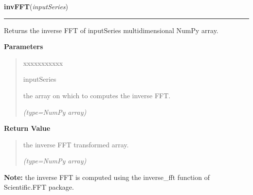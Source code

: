 \hspace{.8\funcindent}\begin{boxedminipage}{\funcwidth}

    \raggedright \textbf{invFFT}(\textit{inputSeries})

    \vspace{-1.5ex}

    \rule{\textwidth}{0.5\fboxrule}
\setlength{\parskip}{2ex}
    Returns the inverse FFT of {\textbar}inputSeries{\textbar} 
    multidimensional NumPy array.

\setlength{\parskip}{1ex}
      \textbf{Parameters}
      \vspace{-1ex}

      \begin{quote}
        \begin{Ventry}{xxxxxxxxxxx}

          \item[inputSeries]

          the array on which to computes the inverse FFT.

            {\it (type=NumPy array)}

        \end{Ventry}

      \end{quote}

      \textbf{Return Value}
    \vspace{-1ex}

      \begin{quote}
      the inverse FFT transformed array.

      {\it (type=NumPy array)}

      \end{quote}

\textbf{Note:} the inverse FFT is computed using the inverse\_fft function of 
Scientific.FFT package.



    \end{boxedminipage}

    \label{nMOLDYN:Core:Mathematics:gaussianWindow}

    \vspace{0.5ex}

